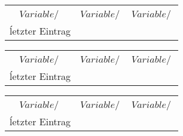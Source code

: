\begin{figure}[hp]
	\begin{minipage}{0.49\textwidth}
		\centering
		\begin{tabular}{S[table-format=] S[table-format=] S[table-format=]}
			\toprule
			\\
			{$Variable/\:\si{}$} & {$Variable/\:\si{}$} & {$Variable/\:\si{}$} \\	
			\midrule
				ĺetzter Eintrag\\
			\bottomrule
			\end{tabular}
	\end{minipage}
	\begin{minipage}{0.49\textwidth}
		\centering
		\begin{tabular}{S[table-format=] S[table-format=] S[table-format=]}
			\toprule
			\\
			{$Variable/\:\si{}$} & {$Variable/\:\si{}$} & {$Variable/\:\si{}$} \\	
			\midrule
				ĺetzter Eintrag\\
			\bottomrule
			\end{tabular}
	\end{minipage}
	\begin{minipage}{0.49\textwidth}
		\centering
		\begin{tabular}{S[table-format=] S[table-format=] S[table-format=]}
			\toprule
			\\
			{$Variable/\:\si{}$} & {$Variable/\:\si{}$} & {$Variable/\:\si{}$} \\	
			\midrule
				ĺetzter Eintrag\\
			\bottomrule
			\end{tabular}
	\end{minipage}
	\caption{}
	\label{}
\end{figure}
